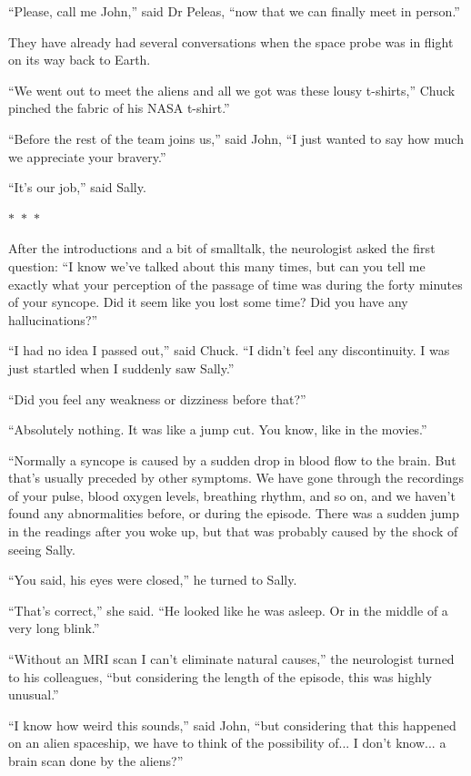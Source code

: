 \documentclass{memoir}
\newcommand{\starbreak}{%
\begin{center}
  $\ast$~$\ast$~$\ast$
\end{center}
}
\begin{document}
``Please, call me John,'' said Dr Peleas, ``now that we can finally meet in person.''

They have already had several conversations when the space probe was in flight on its way back to Earth. 

``We went out to meet the aliens and all we got was these lousy t-shirts,'' Chuck pinched the fabric of his NASA t-shirt.''

``Before the rest of the team joins us,'' said John, ``I just wanted to say how much we appreciate your bravery.'' 

``It's our job,'' said Sally.

\starbreak

After the introductions and a bit of smalltalk, the neurologist asked the first question:
``I know we've talked about this many times, but can you tell me exactly what your perception of the passage of time was during the forty minutes of your syncope. Did it seem like you lost some time? Did you have any hallucinations?''

``I had no idea I passed out,'' said Chuck. ``I didn't feel any discontinuity. I was just startled when I suddenly saw Sally.'' 

``Did you feel any weakness or dizziness before that?''

``Absolutely nothing. It was like a jump cut. You know, like in the movies.''

``Normally a syncope is caused by a sudden drop in blood flow to the brain. But that's usually preceded by other symptoms. We have gone through the recordings of your pulse, blood oxygen levels, breathing rhythm, and so on, and we haven't found any abnormalities before, or during the episode. There was a sudden jump in the readings after you woke up, but that was probably caused by the shock of seeing Sally.

``You said, his eyes were closed,'' he turned to Sally.

``That's correct,'' she said. ``He looked like he was asleep. Or in the middle of a very long blink.''

``Without an MRI scan I can't eliminate natural causes,'' the neurologist turned to his colleagues, ``but considering the length of the episode, this was highly unusual.''

``I know how weird this sounds,'' said John, ``but considering that this happened on an alien spaceship, we have to think of the possibility of... I don't know... a brain scan done by the aliens?''
\end{document}
